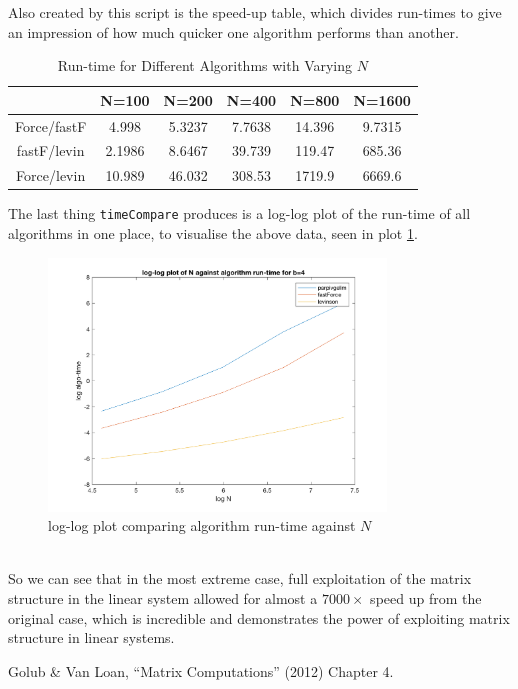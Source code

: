 \documentclass[paper=a4, fontsize=12pt]{scrartcl} %
\numberwithin{equation}{section}       %
\numberwithin{figure}{section}         %
\numberwithin{table}{section}          %
\begin{document}
Also created by this script is the speed-up table, which divides run-times to give an impression of how much quicker one algorithm performs than another.\\

\begin{table}
\begin{center}
  \begin{tabular}{ c||c|c|c|c|c }
	
            &       N=100   &  N=200  &   N=400 &   N=800  &   N=1600\\
	\hline

    Force/fastF   &    4.998  &  5.3237  &  7.7638 &   14.396 &   9.7315\\
    fastF/levin  &  2.1986  &  8.6467  &  39.739  &  119.47  &  685.36\\
    Force/levin    &  10.989  &  46.032  &  308.53  &  1719.9  &  6669.6
  \end{tabular}
\end{center}
\caption{Run-time for Different Algorithms with Varying $N$}
\label{table:3}
\end{table}

\noindent The last thing \texttt{timeCompare} produces is a log-log plot of the run-time of all algorithms in one place, to visualise the above data, seen in plot \ref{fig:timeCompare}.\\

\begin{figure}[h!]
  \centering
  \includegraphics[width=0.8\textwidth]{log-log_plot_timecomparison.png}
  \caption{log-log plot comparing algorithm run-time against $N$}
  \label{fig:timeCompare}
\end{figure}


\\
\noindent So we can see that in the most extreme case, full exploitation of the matrix structure in the linear system allowed for almost a $7000\times$ speed up from the original case, which is incredible and demonstrates the power of exploiting matrix structure in linear systems.  


\newpage








\newpage
\begin{appendix}
\listoffigures
\listoftables

\end{appendix}
\begin{thebibliography}{1}
 Golub \& Van Loan, ``Matrix Computations'' (2012) Chapter 4. \\
\end{thebibliography}
\end{document}
